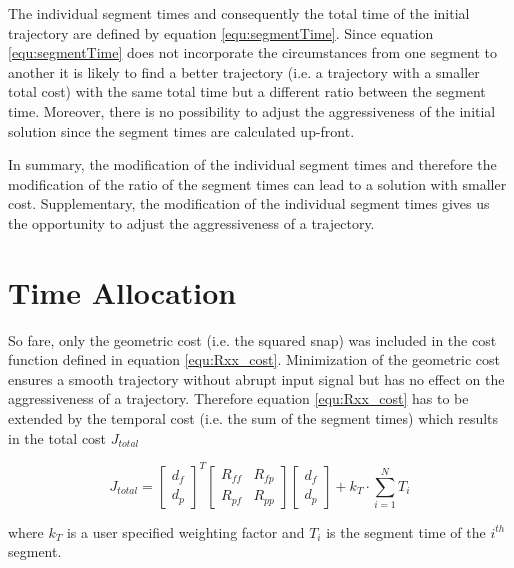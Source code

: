 The individual segment times and consequently the total time of the initial trajectory are defined by equation \ref{equ:segmentTime}. Since equation \ref{equ:segmentTime} does not incorporate the circumstances from one segment to another it is likely to find a better trajectory (i.e. a trajectory with a smaller total cost) with the same total time but a different ratio between the segment time. Moreover, there is no possibility to adjust the aggressiveness of the initial solution since the segment times are calculated up-front. \newline

In summary, the modification of the individual segment times and therefore the modification of the ratio of the segment times can lead to a solution with smaller cost. Supplementary, the modification of the individual segment times gives us the opportunity to adjust the aggressiveness of a trajectory.



\section{Time Allocation}\label{sec:penalty}

So fare, only the geometric cost (i.e. the squared snap) was included in the cost function defined in equation \ref{equ:Rxx_cost}. Minimization of the geometric cost ensures a smooth trajectory without abrupt input signal but has no effect on the aggressiveness of a trajectory. Therefore equation \ref{equ:Rxx_cost} has to be extended by the temporal cost (i.e. the sum of the segment times) which results in the total cost $J_{total}$

\begin{equation}
J_{total} =
\begin{bmatrix}
   d_f \\
  d_p
\end{bmatrix}^T
\begin{bmatrix}
   R_{ff} & R_{fp} \\
  R_{pf} & R_{pp}
\end{bmatrix}
\begin{bmatrix}
   d_f \\
  d_p
\end{bmatrix}
+ k_T \cdot \sum_{i=1}^N T_i
\label{equ:total_cost}
\end{equation}

where $k_T$ is a user specified weighting factor and $T_i$ is the segment time of the $i^{th}$ segment. \newline

